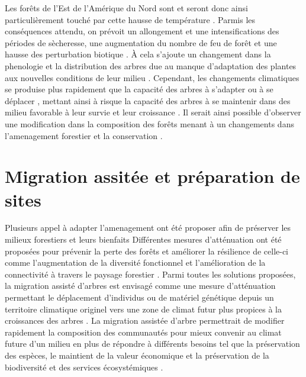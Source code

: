 Les forêts de l'Est de l'Amérique du Nord sont et seront donc ainsi particulièrement touché par cette hausse de température \citep{Park2014Canboreal,Mahony2017closerlook,Messier2022Warningnatural,Sittaro2017Treerange}.
Parmis les conséquences attendu, on prévoit un allongement et une intensifications des périodes de sècheresse, une augmentation du nombre de feu de forêt et une hausse des perturbation biotique \citep{Gatti2021Amazoniacarbon,Heidari2021Effectsclimate,Joyce2013Climatechange,Parmesan2007Influencesspecies}. 
À cela s'ajoute un changement dans la phenologie \citep{Chuine2010Whydoes} et la distribution des arbres \citep{Gray2013Trackingsuitable,Zhu2012Failuremigrate} due au manque d'adaptation des plantes aux nouvelles conditions de leur milieu \citep{Aitken2008Adaptationmigration}.
Cependant, les changements climatiques se produise plus rapidement que la capacité des arbres à s'adapter ou à se déplacer \citep{Aitken2008Adaptationmigration,Harrison2020Plantcommunity,Loarie2009velocityclimate,Messier2022Warningnatural,Williams2013Preparingclimate,Vitt2010Assistedmigration}, 
mettant ainsi à risque la capacité des arbres à se maintenir dans des milieu favorable à leur survie et leur croissance \citep{Sittaro2017Treerange,Woodall2018Decadalchanges,Zhu2012Failuremigrate}.
Il serait ainsi possible d'observer une modification dans la composition des forêts menant à un changements dans l'amenagement forestier et la conservation \cite{Chmura2011Forestresponses,Lo2011Linkingclimate,McKenney2009Climatechange}.

\section*{Migration assitée et préparation de sites}
\label{sec:fam}

Plusieurs appel à adapter l'amenagement ont été proposer afin de préserver les milieux forestiers et leurs bienfaits \citep{Messier2021sakeresilience,Nagel2017Adaptivesilviculture}
Différentes mesures d'atténuation ont été proposées pour prévenir la perte des forêts et améliorer la résilience de celle-ci comme l'augmentation de la diversité fonctionnel et l'amélioration de la connectivité à travers le paysage forestier \citep{Messier2019functionalcomplex}.
Parmi toutes les solutions proposées, la migration assisté d'arbres est envisagé comme une mesure d'atténuation permettant le déplacement d'individus ou de matériel génétique depuis un territoire climatique originel vers une zone de climat futur plus propices à la croissances des arbres \citep{Dumroese2015Considerationsrestoring,Palik2022Operationalizingforestassisted,Park2023Provenancetrials,Park2018Informationunderload,Pedlar2011implementationassisted,Vitt2010Assistedmigration,Williams2013Preparingclimate}. 
La migration assistée d'arbre permettrait de modifier rapidement la composition des communautés pour mieux convenir au climat future d'un milieu \citep{Pedlar2011implementationassisted} 
en plus de répondre à différents besoins tel que la préservation des espèces, le maintient de la valeur économique et la préservation de la biodiversité et des services écosystémiques \citep{Ste-Marie2011Assistedmigration,Winder2011Ecologicalimplications}.

